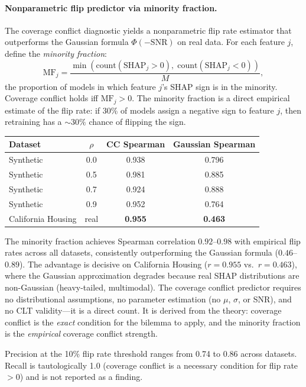 \documentclass{article}
\begin{document}
\paragraph{Nonparametric flip predictor via minority fraction.}
The coverage conflict diagnostic yields a nonparametric flip rate estimator that outperforms the Gaussian formula $\Phi(-\text{SNR})$ on real data.
For each feature $j$, define the \emph{minority fraction}:
\[
    \text{MF}_j = \frac{\min(\text{count}(\text{SHAP}_j > 0),\; \text{count}(\text{SHAP}_j < 0))}{M},
\]
the proportion of models in which feature $j$'s SHAP sign is in the minority.
Coverage conflict holds iff $\text{MF}_j > 0$.
The minority fraction is a direct empirical estimate of the flip rate: if 30\% of models assign a negative sign to feature $j$, then retraining has a ${\sim}30\%$ chance of flipping the sign.

\begin{center}
\small
\begin{tabular}{@{}lccc@{}}
\toprule
Dataset & $\rho$ & CC Spearman & Gaussian Spearman \\
\midrule
Synthetic & 0.0 & 0.938 & 0.796 \\
Synthetic & 0.5 & 0.981 & 0.885 \\
Synthetic & 0.7 & 0.924 & 0.888 \\
Synthetic & 0.9 & 0.952 & 0.764 \\
California Housing & real & \textbf{0.955} & \textbf{0.463} \\
\bottomrule
\end{tabular}
\end{center}

The minority fraction achieves Spearman correlation $0.92$--$0.98$ with empirical flip rates across all datasets, consistently outperforming the Gaussian formula ($0.46$--$0.89$).
The advantage is decisive on California Housing ($r = 0.955$ vs.\ $r = 0.463$), where the Gaussian approximation degrades because real SHAP distributions are non-Gaussian (heavy-tailed, multimodal).
The coverage conflict predictor requires no distributional assumptions, no parameter estimation (no $\mu$, $\sigma$, or SNR), and no CLT validity---it is a direct count.
It is derived from the theory: coverage conflict is the \emph{exact} condition for the bilemma to apply, and the minority fraction is the \emph{empirical} coverage conflict strength.

Precision at the 10\% flip rate threshold ranges from 0.74 to 0.86 across datasets.
Recall is tautologically 1.0 (coverage conflict is a necessary condition for flip rate $> 0$) and is not reported as a finding.
\end{document}
